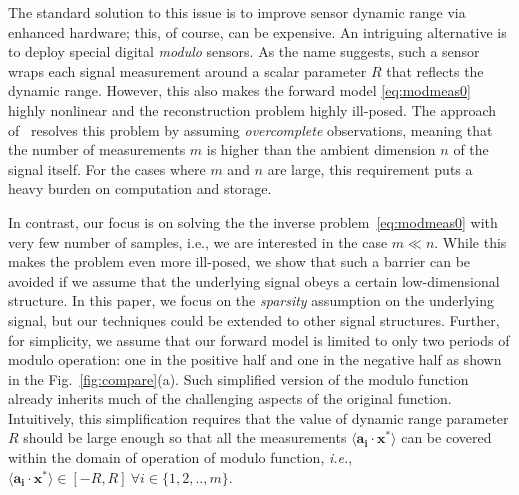 The standard solution to this issue is to improve sensor dynamic range via enhanced hardware; this, of course, can be expensive. An intriguing alternative is to deploy special digital \emph{modulo} sensors. As the name suggests, such a sensor wraps each signal measurement around a scalar parameter $R$ that reflects the dynamic range. However, this also makes the forward model \eqref{eq:modmeas0} highly nonlinear and the reconstruction problem highly ill-posed. The approach of~\cite{Bhandari,Zhao2015} resolves this problem by assuming \emph{overcomplete} observations, meaning that the number of measurements $m$ is higher than the ambient dimension $n$ of the signal itself. For the cases where $m$ and $n$ are large, this requirement puts a heavy burden on computation and storage. 

In contrast, our focus is on solving the the inverse problem~\eqref{eq:modmeas0} with very few number of samples, {i.e.}, we are interested in the case $m \ll n$. While this makes the problem even more ill-posed, we show that such a barrier can be avoided if we assume that the underlying signal obeys a certain low-dimensional structure. In this paper, we focus on the \emph{sparsity} assumption on the underlying signal, but our techniques could be extended to other signal structures. Further, for simplicity, we assume that our forward model is limited to only two periods of modulo operation: one in the positive half and one in the negative half as shown in the Fig.~\ref{fig:compare}(a). Such simplified version of the modulo function already inherits much of the challenging aspects of the original function. Intuitively, this simplification requires that the value of dynamic range parameter $R$ should be large enough so that all the measurements $\langle \mathbf{a_i} \cdot \mathbf{x^*} \rangle$ can be covered within the domain of operation of modulo function, \textit{i.e.}, $\langle \mathbf{a_i} \cdot \mathbf{x^*} \rangle \in [-R,R]~\forall i \in \{1,2,..,m\}$. 

